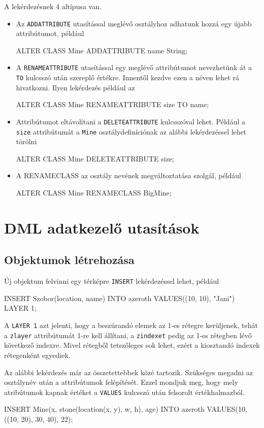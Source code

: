 A lekérdezésnek 4 altípusa van.
\begin{itemize}
\item
Az \texttt{ADDATTRIBUTE} utasítással meglévő osztályhoz adhatunk hozzá egy újabb attribútumot, például
\begin{sql}
ALTER CLASS Mine ADDATTRIBUTE name String;
\end{sql}
\item
A \texttt{RENAMEATTRIBUTE} utasítással egy meglévő attribútumot nevezhetünk át a \texttt{TO} kulcsszó után szereplő értékre. Innentől kezdve ezen a néven lehet rá hivatkozni. Ilyen lekérdezés például az
\begin{sql}
ALTER CLASS Mine RENAMEATTRIBUTE size TO name;
\end{sql}
\item
Attribútumot eltávolítani a \texttt{DELETEATTRIBUTE} kulcsszóval lehet. Például a \texttt{size} attribútumát a \texttt{Mine} osztálydefiníciónak az alábbi lekérdezéssel lehet törölni
\begin{sql}
ALTER CLASS Mine DELETEATTRIBUTE size;
\end{sql}
\item
A RENAMECLASS az osztály nevének megváltoztatása szolgál, például
\begin{sql}
ALTER CLASS Mine RENAMECLASS BigMine;
\end{sql}
\end{itemize}

\section{DML adatkezelő utasítások}

\subsection{Objektumok létrehozása}

Új objektum felvinni egy térképre \texttt{INSERT} lekérdezéssel lehet, például
\begin{sql}
INSERT Szobor(location, name) INTO azeroth
VALUES((10, 10), "Jani") LAYER 1;
\end{sql}
A \texttt{LAYER 1} azt jelenti, hogy a beszúrandó elemek az 1-es rétegre kerüljenek, tehát a \texttt{zlayer} attribútumát 1-re kell állítani, a \texttt{zindexet} pedig az 1-es rétegben lévő következő indexre. Mivel rétegből tetszőleges sok lehet, ezért a kiosztandó indexek rétegenként egyediek.

Az alábbi lekérdezés már az összetettebbek közé tartozik. Szükséges megadni az osztálynév után a attribútumok felépítését. Ezzel mondjuk meg, hogy mely atribútumok kapnak értéket a \texttt{VALUES} kulcsszó után felsorolt értékhalmazból.
\begin{sql}
INSERT Mine(x, stone(location(x, y), w, h), age) INTO azeroth
VALUES(10, ((10, 20), 30, 40), 22);
\end{sql}

